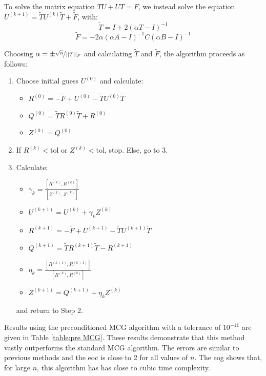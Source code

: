 \documentclass[11pt]{article}
\numberwithin{equation}{section}
\begin{document}
To solve the matrix equation $TU + UT = F$, we instead solve the equation $U^{(k+1)} = \widetilde{T}U^{(k)} \widetilde{T} + \widetilde{F}$, with:
\[ \widetilde{T} = I + 2(\alpha T - I)^{-1} \]
\[ \widetilde{F} = -2\alpha(\alpha A - I)^{-1} C (\alpha B - I)^{-1} \]

Choosing $\alpha = \pm \nicefrac{\sqrt{n}}{||T||_F}$ and calculating $\widetilde{T}$ and $\widetilde{F}$, the algorithm proceeds as follows:
\begin{enumerate}
\item Choose initial guess $U^{(0)}$ and calculate:
	\begin{itemize}
	\item $R^{(0)} = -\widetilde{F} + U^{(0)} - \widetilde{T}U^{(0)} \widetilde{T}$
	\item $Q^{(0)} = \widetilde{T} R^{(0)}\widetilde{T} + R^{(0)}$
	\item $Z^{(0)} = Q^{(0)}$
	\end{itemize}
\item If $R^{(k)} < \text{tol}$ or $Z^{(k)} < \text{tol}$, stop. Else, go to 3.
\item Calculate:
	\begin{itemize}
	\item $ \gamma_k = \frac{[R^{(k)}, R^{(k)}]}{[Z^{(k)}, Z^{(k)}]}$
	\item $U^{(k+1)} = U^{(k)} + \gamma_k Z^{(k)} $
	\item $R^{(k+1)} = -\widetilde{F} + U^{(k+1)} - \widetilde{T}U^{(k+1)} \widetilde{T}$
	\item $Q^{(k+1)} = \widetilde{T} R^{(k+1)}\widetilde{T} - R^{(k+1)}$
	\item $\eta_k = \frac{[R^{(k+1)}, R^{(k+1)}]}{[R^{(k)}, R^{(k)}]}$ 
	\item $Z^{(k+1)} = Q^{(k+1)} + \eta_k Z^{(k)}$
	\end{itemize}
	and return to Step 2.
\end{enumerate}

Results using the preconditioned MCG algorithm with a tolerance of $10^{-11}$ are given in Table \ref{table:pre MCG}. These results demonstrate that this method vastly outperforms the standard MCG algorithm. The errors are similar to previous methods and the eoc is close to 2 for all values of $n$. The eog shows that, for large $n$, this algorithm has has close to cubic time complexity. 
\end{document}
